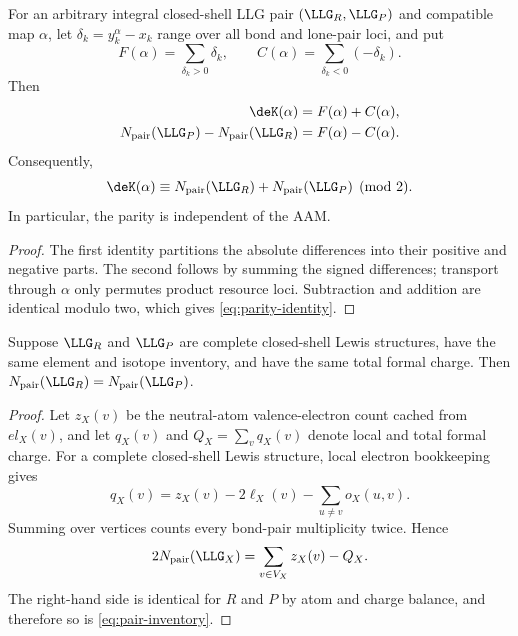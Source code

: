 \begin{proposition}
\label{prop:signed-resource}
For an arbitrary integral closed-shell LLG pair
\((\LLG_R,\LLG_P)\) and compatible map \(\alpha\),
let $\delta_k=y_k^\alpha-x_k$ range over all bond and lone-pair loci, and put
\[
  F(\alpha)=\sum_{\delta_k>0}\delta_k,
  \qquad
  C(\alpha)=\sum_{\delta_k<0}(-\delta_k).
\]
Then
\begin{align}
  \deK(\alpha)&=F(\alpha)+C(\alpha),\\
  N_{\mathrm{pair}}(\LLG_P)-N_{\mathrm{pair}}(\LLG_R)
    &=F(\alpha)-C(\alpha).
\end{align}
Consequently,
\begin{equation}
  \deK(\alpha)
  \equiv
  N_{\mathrm{pair}}(\LLG_R)+N_{\mathrm{pair}}(\LLG_P)
  \pmod 2.
  \label{eq:parity-identity}
\end{equation}
In particular, the parity is independent of the AAM.
\end{proposition}

\begin{proof}
The first identity partitions the absolute differences into their positive
and negative parts.  The second follows by summing the signed differences;
transport through $\alpha$ only permutes product resource loci.  Subtraction
and addition are identical modulo two, which gives
\cref{eq:parity-identity}.
\end{proof}

\begin{lemma}
\label{lem:pair-conservation}
Suppose \(\LLG_R\) and \(\LLG_P\) are complete closed-shell Lewis structures,
have the
same element and isotope inventory, and have the same total formal charge.
Then
\(N_{\mathrm{pair}}(\LLG_R)=N_{\mathrm{pair}}(\LLG_P)\).
\end{lemma}

\begin{proof}
Let \(z_X(v)\) be the neutral-atom valence-electron count cached from
\(el_X(v)\), and let \(q_X(v)\) and \(Q_X=\sum_v q_X(v)\) denote local and
total formal charge.
For a complete closed-shell Lewis structure, local electron bookkeeping gives
\[
  q_X(v)
  =
  z_X(v)
  -2\ell_X(v)
  -\sum_{u\ne v}o_X(u,v).
\]
Summing over vertices counts every bond-pair multiplicity twice.  Hence
\begin{equation}
  2N_{\mathrm{pair}}(\LLG_X)
  =
  \sum_{v\in V_X}z_X(v)-Q_X.
  \label{eq:electron-accounting}
\end{equation}
The right-hand side is identical for $R$ and $P$ by atom and charge balance,
and therefore so is \cref{eq:pair-inventory}.
\end{proof}

